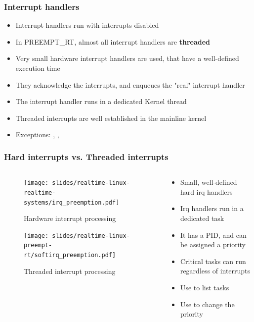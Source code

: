 \begin{frame}
  \frametitle{Interrupt handlers}
	\begin{itemize}
		\item Interrupt handlers run with interrupts disabled
		\item In PREEMPT\_RT, almost all interrupt handlers are \textbf{threaded}
		\item Very small hardware interrupt handlers are used, that have a well-defined execution time
		\item They acknowledge the interrupts, and enqueues the "real" interrupt handler
		\item The interrupt handler runs in a dedicated Kernel thread
		\item Threaded interrupts are well established in the mainline kernel
		\item Exceptions: , , 
	\end{itemize}
\end{frame}

\begin{frame}
	\frametitle{Hard interrupts vs. Threaded interrupts}

	\begin{columns}
	\begin{column}{0.50\textwidth}
	\vspace{-1cm}
	\begin{figure}
	\texttt{[image: slides/realtime-linux-realtime-systems/irq\_preemption.pdf]}
	\vspace{-1cm}
	\caption{Hardware interrupt processing}
	\end{figure}
	\vspace{-0.6cm}
	\begin{figure}
	\texttt{[image: slides/realtime-linux-preempt-rt/softirq\_preemption.pdf]}
	\vspace{-0.8cm}
	\caption{Threaded interrupt processing}
	\end{figure}
	\end{column}

		\begin{column}{0.50\textwidth}
			\begin{itemize}
				\item Small, well-defined hard irq handlers
				\item Irq handlers run in a dedicated task
				\item It has a PID, and can be assigned a priority
				\item Critical tasks can run regardless of interrupts
				\item Use  to list tasks
				\item Use  to change the priority
			\end{itemize}
		\end{column}
	\end{columns}
\end{frame}

